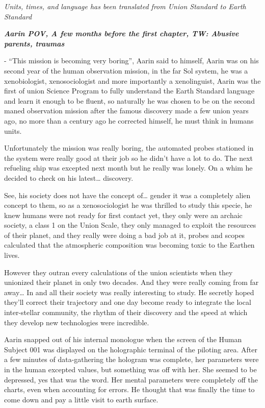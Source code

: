 \documentclass[hidelinks,12pt,a4paper]{book}
\begin{document}
\textit{Units, times, and language has been translated from Union Standard to Earth Standard}\par
\textit{\textbf{Aarin POV, A few months before the first chapter,
TW: Abusive parents, traumas}}\par
\bigskip
- “This mission is becoming very boring”, Aarin said to himself,
Aarin was on his second year of the human observation mission, in the far Sol system, 
he was a xenobiologist, xenosociologist and more importantly a xenolinguist, 
Aarin was the first of \gls{union} Science Program to fully understand the Earth Standard language and 
learn it enough to be fluent, so naturally he was chosen to be on the second maned observation mission after the 
famous discovery made a few union years ago, no more than a century ago he corrected himself, he must think in humans units.\par
\bigskip

Unfortunately the mission was really boring, the automated probes stationed in the system were 
really good at their job so he didn't have a lot to do. The next refueling ship was excepted next 
month but he really was lonely. On a whim he decided to check on his latest… discovery.\par
\bigskip

See, his society does not have the concept of… gender it was a completely alien concept to them, so as a 
xenosociologist he was thrilled to study this specie, he knew humans were not ready for first contact yet, 
they only were an archaic society, a class 1 on the Union Scale, they only managed to exploit the resources of their 
planet, and they really were doing a bad job at it, probes and scopes calculated that the atmospheric composition was 
becoming toxic to the Earthen lives.\par
\bigskip

However they outran every calculations of the union scientists when they unionized their planet in only two decades. 
And they were really coming from far away… In and all their society was really interesting to study. 
He secretly hoped they'll correct their trajectory and one day become ready to integrate the local inter-stellar community, 
the rhythm of their discovery and the speed at which they develop new technologies were incredible.\par
\bigskip

Aarin snapped out of his internal monologue when the screen of the Human Subject 001 was displayed on the holographic terminal of the piloting area.
After a few minutes of data-gathering the hologram was complete, her parameters were in the human excepted values, 
but something was off with her. She seemed to be depressed, yes that was the word. Her mental parameters were completely 
off the charts, even when accounting for errors. He thought that was finally the time to come down and pay a little visit 
to earth surface.\par
\bigskip
\end{document}
